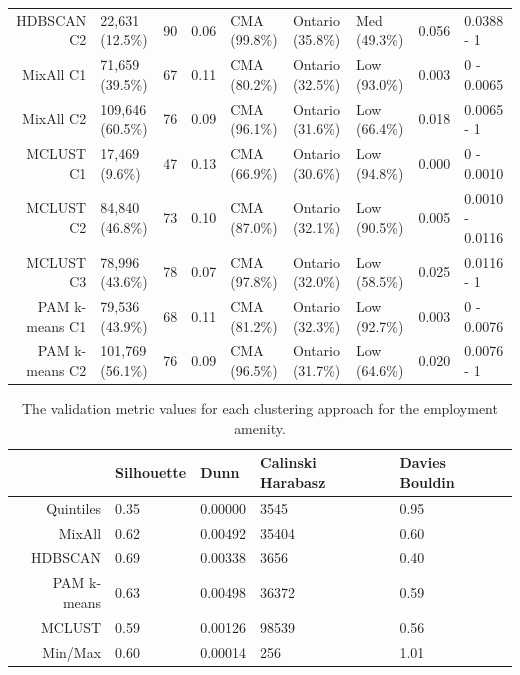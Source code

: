 \documentclass[11pt, a4paper]{article}
\begin{document}
\begin{table}[H]
{\begin{tabular}{|r|llllllll|}
\rowcolor{gray!25}  HDBSCAN C2 & 22,631 (12.5\%) & 90 & 0.06 & CMA (99.8\%) & Ontario (35.8\%) & Med (49.3\%) & 0.056 & 0.0388 - 1 \\ 
  MixAll C1 & 71,659 (39.5\%) & 67 & 0.11 & CMA (80.2\%) & Ontario (32.5\%) & Low (93.0\%) & 0.003 & 0 - 0.0065 \\ 
  MixAll C2 & 109,646 (60.5\%) & 76 & 0.09 & CMA (96.1\%) & Ontario (31.6\%) & Low (66.4\%) & 0.018 & 0.0065 - 1 \\ 
\rowcolor{gray!25}  MCLUST C1 & 17,469 (9.6\%) & 47 & 0.13 & CMA (66.9\%) & Ontario (30.6\%) & Low (94.8\%) & 0.000 & 0 - 0.0010 \\ 
\rowcolor{gray!25}  MCLUST C2 & 84,840 (46.8\%) & 73 & 0.10 & CMA (87.0\%) & Ontario (32.1\%) & Low (90.5\%) & 0.005 & 0.0010 - 0.0116 \\ 
\rowcolor{gray!25}  MCLUST C3 & 78,996 (43.6\%) & 78 & 0.07 & CMA (97.8\%) & Ontario (32.0\%) & Low (58.5\%) & 0.025 & 0.0116 - 1 \\ 
  PAM k-means C1 & 79,536 (43.9\%) & 68 & 0.11 & CMA (81.2\%) & Ontario (32.3\%) & Low (92.7\%) & 0.003 & 0 - 0.0076 \\ 
  PAM k-means C2 & 101,769 (56.1\%) & 76 & 0.09 & CMA (96.5\%) & Ontario (31.7\%) & Low (64.6\%) & 0.020 & 0.0076 - 1 \\ 
   \hline
\end{tabular}
}
\end{table}








\pagebreak


\centering
\begin{longtable}[h]{|r|llll|}
\caption[Employment validation metrics]{The validation metric values for each clustering approach for the employment amenity.}\label{employmentvalid}
\endfirsthead
\endhead
  \hline
 & Silhouette & Dunn & Calinski Harabasz & Davies Bouldin \\ 
  \hline
Quintiles & 0.35 & 0.00000 &  3545 & 0.95 \\ 
   \hline
MixAll & 0.62 & 0.00492 & 35404 & 0.60 \\ 
   \hline
HDBSCAN & \cellcolor{gray!25} 0.69 & 0.00338 &  3656 & \cellcolor{gray!25} 0.40 \\ 
   \hline
PAM k-means & 0.63 & \cellcolor{gray!25} 0.00498 & 36372 & 0.59 \\ 
   \hline
MCLUST & 0.59 & 0.00126 & \cellcolor{gray!25} 98539 & 0.56 \\ 
   \hline
Min/Max & 0.60 & 0.00014 &   256 & 1.01 \\ 
   \hline
\end{longtable}
\end{document}
